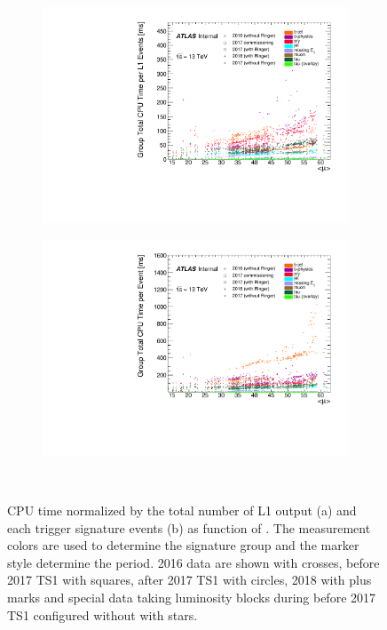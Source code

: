 \begin{figure}[h!tb]
\centering
\begin{subfigure}[c]{.48\textwidth}
\includegraphics[width=\textwidth]{appendices/figures/menu_cpu_measurements/run2_slice_cpu_total_all_data.pdf}
\caption{}%
\label{fig:run2_monitored_cpu_per_mu_norm_l1_evt}
\end{subfigure}
\hfill
\begin{subfigure}[c]{.48\textwidth}
\includegraphics[width=\textwidth]{appendices/figures/menu_cpu_measurements/run2_slice_cpu_time_per_event_all_data.pdf}
\caption{}%
\label{fig:run2_monitored_cpu_per_mu_norm_group_evt}
\end{subfigure} \\
\caption{\label{fig:run2_monitored_cpu_per_mu}CPU time normalized by the
total number of L1 output (a) and each trigger signature events (b) as
function of \avgmu{}. The measurement colors are used to determine the signature
group and the marker style determine the period. 2016 data are shown with
crosses, before 2017 TS1 with squares, after 2017 TS1 with circles, 2018 with
plus marks and special data taking luminosity blocks during before 2017 TS1
configured without \rnn with stars. }
\end{figure}


